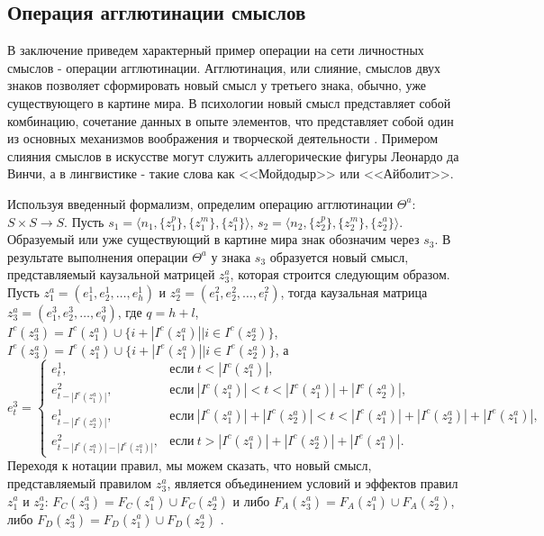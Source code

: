 \documentclass[12pt]{scrartcl}
\begin{document}
		
	\subsection{Операция агглютинации смыслов}
	
	В заключение приведем характерный пример операции на сети личностных смыслов - операции агглютинации. Агглютинация, или слияние, смыслов двух знаков позволяет сформировать новый смысл у третьего знака, обычно, уже существующего в картине мира. В психологии новый смысл представляет собой комбинацию, сочетание данных в опыте элементов, что представляет собой один из основных механизмов воображения и творческой деятельности \cite{Asmolov1990,Rubinshtain2000}. Примером слияния смыслов в искусстве могут служить аллегорические фигуры Леонардо да Винчи, а в лингвистике - такие слова как <<Мойдодыр>> или <<Айболит>>.
	
	Используя введенный формализм, определим операцию агглютинации $\Theta^a$: $S\times S\rightarrow S$. Пусть $s_1=\langle n_1, \{z_1^p\}, \{z_1^m\}, \{z_1^a\} \rangle$, $s_2=\langle n_2, \{z_2^p\}, \{z_2^m\}, \{z_2^a\} \rangle$. Образуемый или уже существующий в картине мира знак обозначим через $s_3$. В результате выполнения операции $\Theta^a$ у знака $s_3$ образуется новый смысл, представляемый каузальной матрицей $z_3^a$, которая строится следующим образом. Пусть $z_1^a=(e_1^1, e_2^1,\dots,e_h^1)$ и $z_2^a=(e_1^2, e_2^2,\dots,e_l^2)$, тогда каузальная матрица $z_3^a=(e_1^3, e_2^3,\dots,e_q^3)$, где $q=h+l$, $I^c(z_3^a)=I^c(z_1^a)\cup \{i+|I^c(z_1^a)||i\in I^c(z_2^a)\}$, $I^e(z_3^a)=I^e(z_1^a)\cup \{i+|I^e(z_1^a)||i\in I^e(z_2^a)\}$, а 
	\[
		e_t^3=\begin{cases}
		e_t^1, &\text{если}\ t<|I^c(z_1^a)|,\\
		e_{t-|I^c(z_1^a)|}^2, &\text{если}\ |I^c(z_1^a)|<t<|I^c(z_1^a)|+|I^c(z_2^a)|,\\
		e_{t-|I^c(z_2^a)|}^1, &\text{если}\ |I^c(z_1^a)|+|I^c(z_2^a)|<t<|I^c(z_1^a)|+|I^c(z_2^a)|+|I^e(z_1^a)|,\\
		e_{t-|I^c(z_1^a)|-|I^e(z_1^a)|}^2, &\text{если}\ t>|I^c(z_1^a)|+|I^c(z_2^a)|+|I^e(z_1^a)|.
		\end{cases}
	\]
	Переходя к нотации правил, мы можем сказать, что новый смысл, представляемый правилом $z_3^a$, является объединением условий и эффектов правил $z_1^a$ и $z_2^a$: $F_C(z_3^a)=F_C(z_1^a)\cup F_C(z_2^a)$ и либо $F_A(z_3^a)=F_A(z_1^a)\cup F_A(z_2^a)$, либо $F_D(z_3^a)=F_D(z_1^a)\cup F_D(z_2^a)$ \cite{Osipov2016a}.
	
\end{document}
